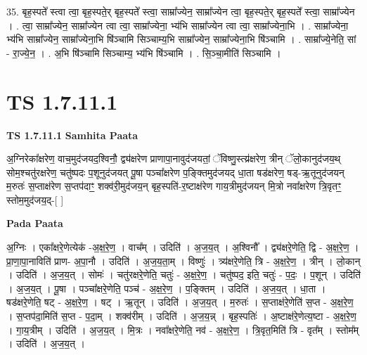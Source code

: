 \documentclass[17pt]{extarticle}
\begin{document}
35. बृह॒स्पते᳚ स्त्वा त्वा॒ बृह॒स्पते॒र् बृह॒स्पते᳚ स्त्वा॒ साम्रा᳚ज्येन॒ साम्रा᳚ज्येन त्वा॒ बृह॒स्पते॒र् बृह॒स्पते᳚ स्त्वा॒ साम्रा᳚ज्येन । . त्वा॒ साम्रा᳚ज्येन॒ साम्रा᳚ज्येन त्वा त्वा॒ साम्रा᳚ज्येना॒ भ्य॑भि साम्रा᳚ज्येन त्वा त्वा॒ साम्रा᳚ज्येना॒भि । . साम्रा᳚ज्येना॒ भ्य॑भि साम्रा᳚ज्येन॒ साम्रा᳚ज्येना॒भि षि॑ञ्चामि सिञ्चाम्य॒भि साम्रा᳚ज्येन॒ साम्रा᳚ज्येना॒भि षि॑ञ्चामि । . साम्रा᳚ज्ये॒नेति॒ सां - रा॒ज्ये॒न॒ । . अ॒भि षि॑ञ्चामि सिञ्चाम्य॒ भ्य॑भि षि॑ञ्चामि । . सि॒ञ्चा॒मीति॑ सिञ्चामि । \newline
\pagebreak
{}

\section{ TS 1.7.11.1 }

\textbf{TS 1.7.11.1 } \newline
\textbf{Samhita Paata} \newline

अ॒ग्निरेका᳚क्षरेण॒ वाच॒मुद॑जयद॒श्विनौ॒ द्व्य॑क्षरेण प्राणापा॒नावुद॑जयतां॒ ॅविष्णु॒स्त्य्र॑क्षरेण॒ त्रीन् ॅलो॒कानुद॑जय॒थ् सोम॒श्चतु॑रक्षरेण॒ चतु॑ष्पदः प॒शूनुद॑जयत् पू॒षा पञ्चा᳚क्षरेण प॒ङ्क्तिमुद॑जयद् धा॒ता षड॑क्षरेण॒ षड्-ऋ॒तूनुद॑जयन् म॒रुतः॑ स॒प्ताक्ष॑रेण स॒प्तप॑दाꣳ॒॒ शक्व॑री॒मुद॑जय॒न् बृह॒स्पति॑-र॒ष्टाक्ष॑रेण गाय॒त्रीमुद॑जयन् मि॒त्रो नवा᳚क्षरेण त्रि॒वृतꣳ॒॒ स्तोम॒मुद॑जय॒द्-[ ] \newline

\textbf{Pada Paata} \newline

अ॒ग्निः । एका᳚क्षरे॒णेत्येक॑ -अ॒क्ष॒रे॒ण॒ । वाच᳚म् । उदिति॑ । अ॒ज॒य॒त् । अ॒श्विनौ᳚ । द्व्य॑क्षरे॒णेति॒ द्वि - अ॒क्ष॒रे॒ण॒ । प्रा॒णा॒पा॒नाविति॑ प्राण- अ॒पा॒नौ । उदिति॑ । अ॒ज॒य॒ता॒म् । विष्णुः॑ । त्र्य॑क्षरे॒णेति॒ त्रि - अ॒क्ष॒रे॒ण॒ । त्रीन् । लो॒कान् । उदिति॑ । अ॒ज॒य॒त् । सोमः॑ । चतु॑रक्षरे॒णेति॒ चतुः॑ - अ॒क्ष॒रे॒ण॒ । चतु॑ष्पद॒ इति॒ चतुः॑ - प॒दः॒ । प॒शून् । उदिति॑ । अ॒ज॒य॒त् । पू॒षा । पञ्चा᳚क्षरे॒णेति॒ पञ्च॑ - अ॒क्ष॒रे॒ण॒ । प॒ङ्क्तिम् । उदिति॑ । अ॒ज॒य॒त् । धा॒ता । षड॑क्षरे॒णेति॒ षट् - अ॒क्ष॒रे॒ण॒ । षट् । ऋ॒तून् । उदिति॑ । अ॒ज॒य॒त् । म॒रुतः॑ । स॒प्ताक्ष॑रे॒णेति॑ स॒प्त - अ॒क्ष॒रे॒ण॒ । स॒प्तप॑दा॒मिति॑ स॒प्त - प॒दा॒म् । शक्व॑रीम् । उदिति॑ । अ॒ज॒य॒न्न् । बृह॒स्पतिः॑ । अ॒ष्टाक्ष॑रे॒णेत्य॒ष्टा - अ॒क्ष॒रे॒ण॒ । गा॒य॒त्रीम् । उदिति॑ । अ॒ज॒य॒त् । मि॒त्रः । नवा᳚क्षरे॒णेति॒ नव॑ - अ॒क्ष॒रे॒ण॒ । त्रि॒वृत॒मिति॑ त्रि - वृत᳚म् । स्तोम᳚म् । उदिति॑ । अ॒ज॒य॒त् ।  \newline
\end{document}
